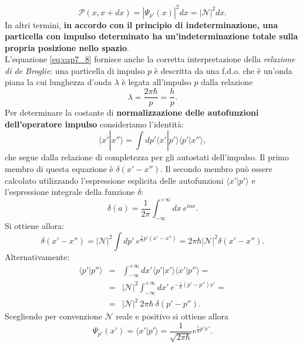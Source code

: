 \begin{equation}
\mathcal{P}(x,x+dx) = |\Psi_{p'}(x)|^2 dx = |\mathcal{N}|^2 dx.
\end{equation}
\noindent In altri termini, \textbf{in accordo con il principio di indeterminazione, una particella con impulso determinato ha un'indeterminazione totale sulla propria posizione nello spazio}.\\
L'equazione \eqref{eq:cap7_8} fornisce anche la corretta interpretazione della \emph{relazione di de Broglie}: una particella di impulso $p$ è descritta da una f.d.o. che è un'onda piana la cui lunghezza d'onda $\lambda$ è legata all'impulso $p$ dalla relazione
\begin{equation}
\lambda = \frac{2 \pi \hbar}{p} = \frac{h}{p}.
\end{equation}
Per determinare la costante di \textbf{normalizzazione delle autofunzioni dell'operatore impulso} consideriamo l'identità:
\begin{equation}
\langle x' | x'' \rangle = \int dp' \langle x' | p' \rangle \langle p' | x'' \rangle,
\end{equation}
che segue dalla relazione di completezza per gli autostati dell'impulso. Il primo membro di questa equazione è $\delta (x' - x'')$. Il secondo membro può essere calcolato utilizzando l'espressione esplicita delle autofunzioni $\langle x' | p' \rangle$ e l'espressione integrale della funzione $\delta$:
\begin{equation}
\delta (a) = \frac{1}{2 \pi} \int_{-\infty}^{+ \infty} dx ~ e^{i a x}.
\end{equation}
\noindent Si ottiene allora:
\begin{equation}
\delta (x' - x'') = |\mathcal{N}|^2 \int dp' ~ e^{\frac{i}{\hbar}p' (x' - x'')} = 2 \pi \hbar |\mathcal{N}|^2 \delta (x' - x'').
\end{equation}
Alternativamente:
\begin{eqnarray}
\langle p' | p'' \rangle &=& \int_{-\infty}^{+ \infty} dx' \langle p' | x' \rangle \langle x' | p'' \rangle = \nonumber \\
&=&  |\mathcal{N}|^2 \int_{-\infty}^{+ \infty} dx' ~ e^{-\frac{i}{\hbar}(p'-p'')x'}= \nonumber \\
&=&  |\mathcal{N}|^2 ~ 2 \pi \hbar ~ \delta (p'-p'') .
\end{eqnarray}
Scegliendo per convenzione $\mathcal{N}$ reale e positivo si ottiene allora
\begin{equation}
\Psi_{p'}(x') = \langle x' | p' \rangle = \frac{1}{\sqrt{2 \pi \hbar}} e^{\frac{i}{\hbar}p'x'}.
\end{equation}

